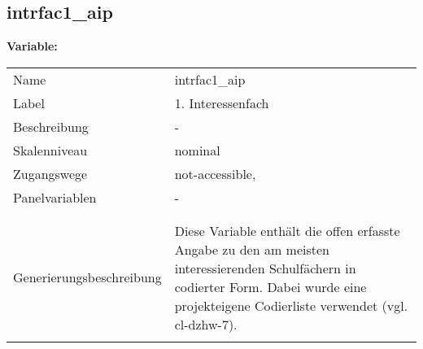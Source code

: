 	
	
	\subsection{intrfac1\_aip}
	\label{subSection:intrfac1_aip}

	\noindent\textbf{Variable:}\\
		\begin{tabular}{lL{11.3cm}}
			\label{tableVariable:intrfac1_aip}
			Name & intrfac1\_aip \\
			Label & 1. Interessenfach \\
			Beschreibung & - \\
			Skalenniveau & nominal \\
			Zugangswege &
				not-accessible,
 \\
			Panelvariablen & -
			 \\
			 \\
 \\
					Generierungsbeschreibung & Diese Variable enthält die offen erfasste Angabe zu den am meisten interessierenden Schulfächern in codierter Form. Dabei wurde eine projekteigene Codierliste verwendet (vgl. cl-dzhw-7).
				 \\	
			 \\
		\end{tabular}






	
	\newpage
